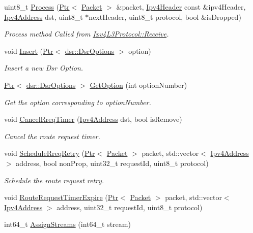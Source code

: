 \begin{DoxyCompactItemize}
\item 
uint8\+\_\+t \hyperlink{classns3_1_1dsr_1_1DsrRouting_aae399429f2359860fbb7992313a2dbd1}{Process} (\hyperlink{classns3_1_1Ptr}{Ptr}$<$ \hyperlink{classns3_1_1Packet}{Packet} $>$ \&packet, \hyperlink{classns3_1_1Ipv4Header}{Ipv4\+Header} const \&ipv4\+Header, \hyperlink{classns3_1_1Ipv4Address}{Ipv4\+Address} dst, uint8\+\_\+t $\ast$next\+Header, uint8\+\_\+t protocol, bool \&is\+Dropped)
\begin{DoxyCompactList}\small\item\em Process method Called from \hyperlink{classns3_1_1Ipv4L3Protocol_a2f27fb0a3f698ffb34a654323b063c94}{Ipv4\+L3\+Protocol\+::\+Receive}. \end{DoxyCompactList}\item 
void \hyperlink{classns3_1_1dsr_1_1DsrRouting_af84bc8969d7d9e4ff167cab6bca88ce0}{Insert} (\hyperlink{classns3_1_1Ptr}{Ptr}$<$ \hyperlink{classns3_1_1dsr_1_1DsrOptions}{dsr\+::\+Dsr\+Options} $>$ option)
\begin{DoxyCompactList}\small\item\em Insert a new Dsr Option. \end{DoxyCompactList}\item 
\hyperlink{classns3_1_1Ptr}{Ptr}$<$ \hyperlink{classns3_1_1dsr_1_1DsrOptions}{dsr\+::\+Dsr\+Options} $>$ \hyperlink{classns3_1_1dsr_1_1DsrRouting_a5cdb4c336831a3158c6ba12d226a198e}{Get\+Option} (int option\+Number)
\begin{DoxyCompactList}\small\item\em Get the option corresponding to option\+Number. \end{DoxyCompactList}\item 
void \hyperlink{classns3_1_1dsr_1_1DsrRouting_ad489fa602b093c8336cf4143ed60e429}{Cancel\+Rreq\+Timer} (\hyperlink{classns3_1_1Ipv4Address}{Ipv4\+Address} dst, bool is\+Remove)
\begin{DoxyCompactList}\small\item\em Cancel the route request timer. \end{DoxyCompactList}\item 
void \hyperlink{classns3_1_1dsr_1_1DsrRouting_a056b38f3af6c2992be89b8fc5cb15448}{Schedule\+Rreq\+Retry} (\hyperlink{classns3_1_1Ptr}{Ptr}$<$ \hyperlink{classns3_1_1Packet}{Packet} $>$ packet, std\+::vector$<$ \hyperlink{classns3_1_1Ipv4Address}{Ipv4\+Address} $>$ address, bool non\+Prop, uint32\+\_\+t request\+Id, uint8\+\_\+t protocol)
\begin{DoxyCompactList}\small\item\em Schedule the route request retry. \end{DoxyCompactList}\item 
void \hyperlink{classns3_1_1dsr_1_1DsrRouting_aa839b89cdf568048c4d09941b59e46d4}{Route\+Request\+Timer\+Expire} (\hyperlink{classns3_1_1Ptr}{Ptr}$<$ \hyperlink{classns3_1_1Packet}{Packet} $>$ packet, std\+::vector$<$ \hyperlink{classns3_1_1Ipv4Address}{Ipv4\+Address} $>$ address, uint32\+\_\+t request\+Id, uint8\+\_\+t protocol)
\item 
int64\+\_\+t \hyperlink{classns3_1_1dsr_1_1DsrRouting_aeaf02a6958f35bc630bae7729e9a7643}{Assign\+Streams} (int64\+\_\+t stream)
\end{DoxyCompactItemize}
